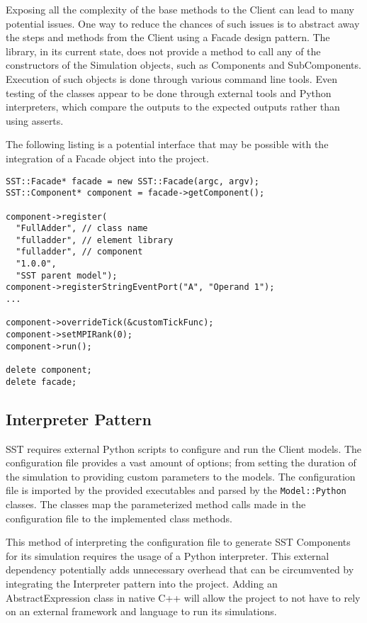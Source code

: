 Exposing all the complexity of the base methods to the Client can lead to many potential issues. One way to reduce the chances of such issues is to abstract away the steps and methods from the Client using a Facade design pattern. The library, in its current state, does not provide a method to call any of the constructors of the Simulation objects, such as Components and SubComponents. Execution of such objects is done through various command line tools. Even testing of the classes appear to be done through external tools and Python interpreters, which compare the outputs to the expected outputs rather than using asserts.

The following listing is a potential interface that may be possible with the integration of a Facade object into the project.

\begin{lstlisting}[style=customC++,label=facade,caption=Potential Implementation of Facade]
SST::Facade* facade = new SST::Facade(argc, argv);
SST::Component* component = facade->getComponent();

component->register(
  "FullAdder", // class name
  "fulladder", // element library
  "fulladder", // component
  "1.0.0",
  "SST parent model");
component->registerStringEventPort("A", "Operand 1");
...

component->overrideTick(&customTickFunc);
component->setMPIRank(0);
component->run();

delete component;
delete facade;
\end{lstlisting}

\newpage
\subsection{Interpreter Pattern}
SST requires external Python scripts to configure and run the Client models. The configuration file provides a vast amount of options; from setting the duration of the simulation to providing custom parameters to the models. The configuration file is imported by the provided executables and parsed by the \texttt{Model::Python} classes. The classes map the parameterized method calls made in the configuration file to the implemented class methods.

This method of interpreting the configuration file to generate SST Components for its simulation requires the usage of a Python interpreter. This external dependency potentially adds unnecessary overhead that can be circumvented by integrating the Interpreter pattern into the project. Adding an AbstractExpression class in native C++ will allow the project to not have to rely on an external framework and language to run its simulations.

